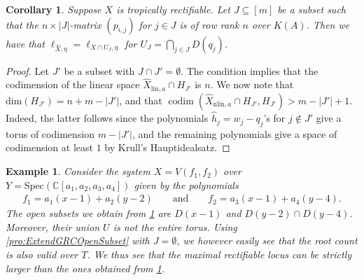 \documentclass[12pt,reqno,a4paper]{amsart}
\theoremstyle{theoremstyle}
\newtheorem{corollary}[theorem]{Corollary}
\theoremstyle{examplestyle}
\newtheorem{example}[theorem]{Example}
\theoremstyle{algorithmstyle}
\newcommand{\lin}{{\mathrm{lin}}}
\DeclareMathOperator{\codim}{codim}
\begin{document}
\begin{corollary}\label{cor:OpenSetExtendGRC}
  Suppose $X$ is tropically rectifiable. Let $J\subseteq [m]$ be a subset such that the $n\times{|J|}$-matrix $(p_{i,j})$ for $j\in{J}$ is of row rank $n$ over $K(A)$.  Then we have that $\ell_{\widehat{X},\eta}=\ell_{X\cap U_J,\eta}$ for $U_J=\bigcap_{j\in J}D(q_{j})$.
\end{corollary}
\begin{proof}
  Let $J'$ be a subset with $J\cap J'=\emptyset$. The condition implies that the codimension of the linear space $\widehat X_{\lin,a}\cap H_{J'}$ is $n$. %
  We now note that $\mathrm{dim}(H_{J'})=n+m-|J'|$, and that $\codim(\widehat{X}_{\mathrm{nlin},a}\cap{H}_{J'},H_{J'})>m-|J'|+1$. Indeed, the latter follows since the polynomials $\hat{h}_{j}=w_{j}-q_{j}$'s for $j\notin{J'}$ give a torus of codimension $m-|J'|$, and the remaining polynomials give a space of codimension at least $1$ by Krull's Hauptidealsatz.
\end{proof}




\begin{example}
  Consider the system $X=V(f_{1},f_{2})$ over $Y=\mathrm{Spec}(\mathbb{C}[a_{1},a_{2},a_{3},a_{4}])$ given by the polynomials
  \begin{align*}
    f_{1}=a_{1}(x-1)+a_{2}(y-2)\qquad \text{and}\qquad
    f_{2}=a_{3}(x-1)+a_{4}(y-4).
  \end{align*}
  The open subsets we obtain from \cref{cor:OpenSetExtendGRC} are $D(x-1)$ and $D(y-2)\cap{D(y-4)}$. Moreover, their union $U$ is not the entire torus.
  Using \cref{pro:ExtendGRCOpenSubset} with $J=\emptyset$, we however easily see that the root count is also valid over $T$. We thus see that the maximal rectifiable locus can be strictly larger than the ones obtained from \cref{cor:OpenSetExtendGRC}.
\end{example}
\end{document}
